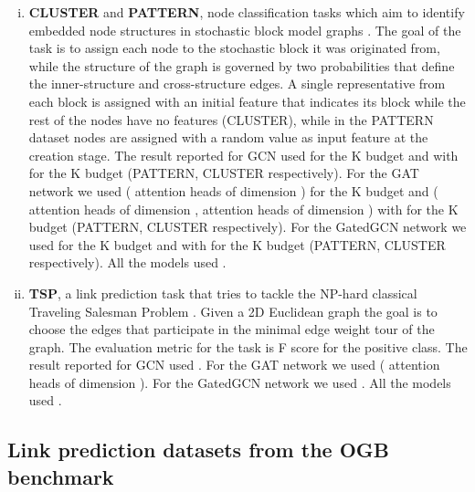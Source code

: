 \documentclass{article} \usepackage{iclr2021_conference,times}
\begin{document}
\begin{enumerate}[(i)]
\item \textbf{CLUSTER} and \textbf{PATTERN}, node classification tasks which aim to identify embedded node structures in stochastic block model graphs \citep{abbe2017community}. The goal of the task is to assign each node to the stochastic block it was originated from, while the structure of the graph is governed by two probabilities that define the inner-structure and cross-structure edges. A single representative from each block is assigned with an initial feature that indicates its block while the rest of the nodes have no features (CLUSTER), while in the PATTERN dataset nodes are assigned with a random value as input feature at the creation stage.
The result reported for GCN used  for the K budget and  with  for the K budget (PATTERN, CLUSTER respectively). For the GAT network we used  ( attention heads of dimension ) for the K budget and  ( attention heads of dimension ,  attention heads of dimension ) with  for the K budget (PATTERN, CLUSTER respectively). For the GatedGCN network we used  for the K budget and  with  for the K budget (PATTERN, CLUSTER respectively).
All the models used .

\item \textbf{TSP}, a link prediction task that tries to tackle the NP-hard classical Traveling Salesman Problem \citep{joshi2019efficient}. Given a 2D Euclidean graph the goal is to choose the edges that participate in the minimal edge weight tour of the graph. The evaluation metric for the task is F score for the positive class.
The result reported for GCN used  . For the GAT network we used  ( attention heads of dimension ). For the GatedGCN network we used .
All the models used .

\end{enumerate}

\subsection{Link prediction datasets from the OGB benchmark \citep{Hu2020}} \label{app:ogb}
\end{document}
